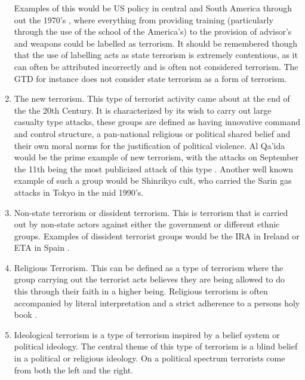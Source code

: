 \begin{enumerate}
Examples of this would be US policy in central and South America through out the 1970's \citep{gareau2004state}, where everything from providing training (particularly through the use of the school of the America's) to the provision of advisor's and weapons \citep{koonings1999societies} could be labelled as terrorism. It should be remembered though that the use of labelling acts as state terrorism is extremely contentious, as it can often be attributed incorrectly and is often not considered terrorism. The GTD for instance does not consider state terrorism as a form of terrorism.
\item The new terrorism. This type of terrorist activity came about at the end of the the 20th Century. It is characterized by its wish to carry out large casualty type attacks, these groups are defined as having innovative command and control structure, a pan-national religious or political shared belief and their own moral norms for the justification of political violence. Al Qa'ida would be the prime example of new terrorism, with the attacks on September the 11th being the most publicized attack of this type \citep{burke2004qaeda}. Another well known example of such a group would be Shinrikyo cult, \citep{morgan2004origins} who carried the Sarin gas attacks in Tokyo in the mid 1990's.
\item  Non-state terrorism or dissident terrorism. This is terrorism that is carried out by non-state actors against either the government or different ethnic groups. Examples of dissident terrorist groups would be the IRA in Ireland or ETA in Spain \citep{lutz2009successful}.
\item  Religious Terrorism. This can be defined as a type of terrorism where the group carrying out the terrorist acts believes they are being  allowed to do this through their faith in a higher being. Religious terrorism is often accompanied by literal interpretation and a strict adherence to a persons holy book \citep{pratt2015terrorism}.
\item Ideological terrorism is a type of terrorism inspired by a belief system or political ideology. The central theme of this type of terrorism is a blind belief in a political or religious ideology. On a political spectrum terrorists come from both the left and the right.

\end{enumerate}

